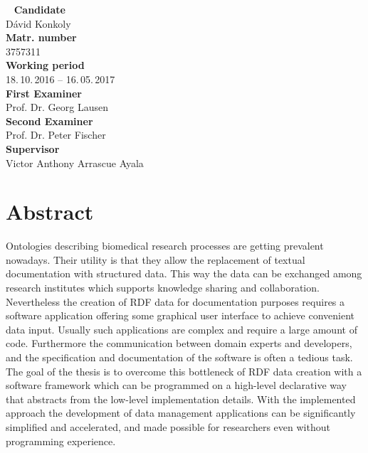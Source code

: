 


%
\newpage
~\vfill
\noindent \textbf{Candidate}\smallskip{}
\\
Dávid Konkoly \smallskip{}
\\
\noindent \textbf{Matr. number}\smallskip{}
\\
3757311 \smallskip{}
\\
\textbf{Working period}\smallskip{}
\\
18.\,10.\,2016 -- 16.\,05.\,2017 \smallskip{}
\\
\textbf{First Examiner}\smallskip{}
\\
Prof. Dr. Georg Lausen\smallskip{}
\\
\textbf{Second Examiner}\smallskip{}
\\
Prof. Dr. Peter Fischer\smallskip{}
\\
\textbf{Supervisor}\smallskip{}
\\
Victor Anthony Arrascue Ayala\\

\newpage
\chapter*{Abstract}


Ontologies describing biomedical research processes are getting prevalent nowadays. Their utility is that they allow the replacement of textual documentation with structured data. This way the data can be exchanged among research institutes which supports knowledge sharing and collaboration. Nevertheless the creation of RDF data for documentation purposes requires a software application offering some graphical user interface to achieve convenient data input. Usually such applications are complex and require a large amount of code. Furthermore the communication between domain experts and developers, and the specification and documentation of the software is often a tedious task. The goal of the thesis is to overcome this bottleneck of RDF data creation with a software framework which can be programmed on a high-level declarative way that abstracts from the low-level implementation details. With the implemented approach the development of data management applications can be significantly simplified and accelerated, and made possible for researchers even without programming experience.

